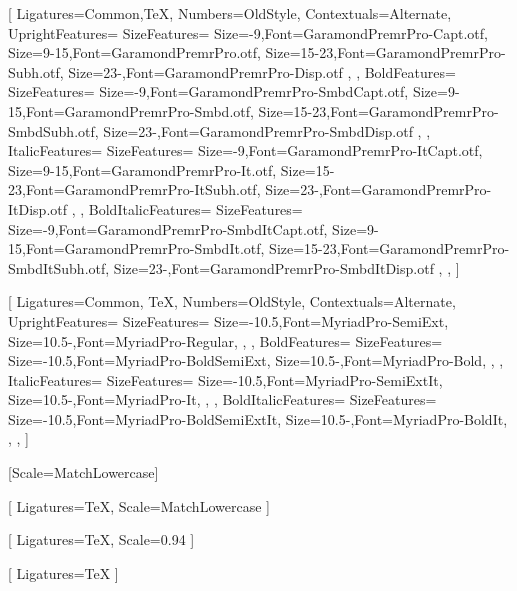%



\setmainfont{GaramondPremrPro.otf}[
    Ligatures={Common,TeX},
    Numbers={OldStyle},
    Contextuals={Alternate},
    UprightFeatures={
        SizeFeatures={ 
            {Size={-9},Font=GaramondPremrPro-Capt.otf},
            {Size={9-15},Font=GaramondPremrPro.otf},
            {Size={15-23},Font=GaramondPremrPro-Subh.otf},
            {Size={23-},Font=GaramondPremrPro-Disp.otf}
        },
    },
    BoldFeatures={
        SizeFeatures={ 
            {Size={-9},Font=GaramondPremrPro-SmbdCapt.otf},
            {Size={9-15},Font=GaramondPremrPro-Smbd.otf},
            {Size={15-23},Font=GaramondPremrPro-SmbdSubh.otf},
            {Size={23-},Font=GaramondPremrPro-SmbdDisp.otf}
        },
    },
    ItalicFeatures={
        SizeFeatures={ 
            {Size={-9},Font=GaramondPremrPro-ItCapt.otf},
            {Size={9-15},Font=GaramondPremrPro-It.otf},
            {Size={15-23},Font=GaramondPremrPro-ItSubh.otf},
            {Size={23-},Font=GaramondPremrPro-ItDisp.otf}
        },
    },
    BoldItalicFeatures={
        SizeFeatures={ 
            {Size={-9},Font=GaramondPremrPro-SmbdItCapt.otf},
            {Size={9-15},Font=GaramondPremrPro-SmbdIt.otf},
            {Size={15-23},Font=GaramondPremrPro-SmbdItSubh.otf},
            {Size={23-},Font=GaramondPremrPro-SmbdItDisp.otf}
        },
    },
]

\setsansfont{Myriad Pro}[
    Ligatures={Common, TeX},
    Numbers={OldStyle},
    Contextuals={Alternate},
    UprightFeatures={
        SizeFeatures={ 
            {Size={-10.5},Font=MyriadPro-SemiExt},
            {Size={10.5-},Font=MyriadPro-Regular},
        },
    },
    BoldFeatures={
        SizeFeatures={ 
            {Size={-10.5},Font=MyriadPro-BoldSemiExt},
            {Size={10.5-},Font=MyriadPro-Bold},
        },
    },
    ItalicFeatures={
        SizeFeatures={ 
            {Size={-10.5},Font=MyriadPro-SemiExtIt},
            {Size={10.5-},Font=MyriadPro-It},
        },
    },
    BoldItalicFeatures={
        SizeFeatures={ 
            {Size={-10.5},Font=MyriadPro-BoldSemiExtIt},
            {Size={10.5-},Font=MyriadPro-BoldIt},
        },
    },
]

\setmonofont{Iosevka}[Scale=MatchLowercase]

[
    Ligatures=TeX,
    Scale=MatchLowercase
]

\setmathfontface{}[
    Ligatures=TeX,
    Scale=0.94
]
\setoperatorfont\mathoper

\newfontface{}[
    Ligatures=TeX
]
